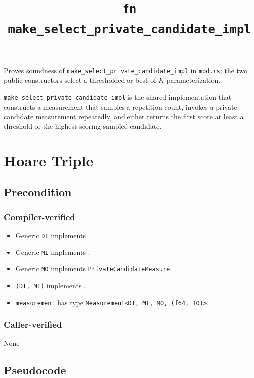 \documentclass{article}
\title{\texttt{fn make\_select\_private\_candidate\_impl}}
\author{\MichaelShoemateAuthor}
\date{}
\begin{document}
\maketitle

\contrib
Proves soundness of \texttt{make\_select\_private\_candidate\_impl} in \texttt{mod.rs}; the two public constructors select a thresholded or best-of-$K$ parameterization.

\texttt{make\_select\_private\_candidate\_impl} is the shared implementation that constructs a measurement that samples a repetition count,
invokes a private candidate measurement repeatedly, and either returns the first score at least a
threshold or the highest-scoring sampled candidate.

\section{Hoare Triple}
\subsection*{Precondition}
\subsubsection*{Compiler-verified}
\begin{itemize}
    \item Generic \texttt{DI} implements .
    \item Generic \texttt{MI} implements .
    \item Generic \texttt{MO} implements \texttt{PrivateCandidateMeasure}.
    \item \texttt{(DI, MI)} implements .
    \item \texttt{measurement} has type \texttt{Measurement<DI, MI, MO, (f64, TO)>}.
\end{itemize}

\subsubsection*{Caller-verified}
None

\subsection*{Pseudocode}

\end{document}
